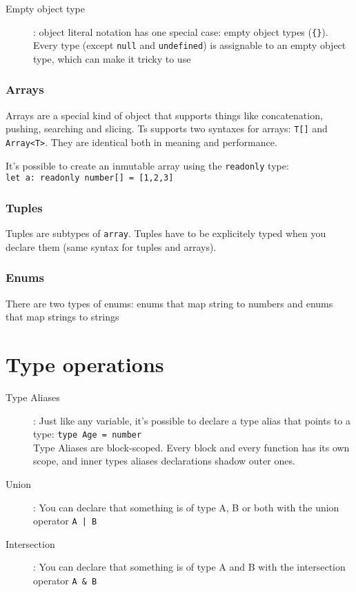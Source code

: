 \documentclass[french]{article}
\begin{document}
\begin{description}
  \item[Empty object type]: object literal notation has one special case: empty object types (\lstinline|{}|). Every type (except \lstinline{null} and \lstinline{undefined}) is assignable to an empty object type, which can make it tricky to use

\end{description}

\subsubsection{Arrays}

Arrays are a special kind of object that supports things like concatenation, pushing, searching and slicing. Ts supports two syntaxes for arrays: \lstinline{T[]} and \lstinline{Array<T>}. They are identical both in meaning and performance.

It's possible to create an inmutable array using the \lstinline{readonly} type: \\\lstinline{let a: readonly number[] = [1,2,3]}

\subsubsection{Tuples}

Tuples are subtypes of \lstinline{array}. Tuples have to be explicitely typed when you declare them (same syntax for tuples and arrays).

\subsubsection{Enums}

There are two types of enums: enums that map string to numbers and enums that map strings to strings

\section{Type operations}

\begin{description}
  \item[Type Aliases]: Just like any variable, it's possible to declare a type alias that points to a type: \lstinline{type Age = number} \\
    Type Aliases are block-scoped. Every block and every function has its own scope, and inner types aliases declarations shadow outer ones.
  \item[Union]: You can declare that something is of type A, B or both with the union operator \lstinline{A | B} 
  \item[Intersection]: You can declare that something is of type A and B with the intersection operator \lstinline{A & B} 
\end{description}
\end{document}
